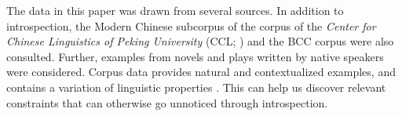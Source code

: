 The data in this paper was drawn from several sources.
In addition to introspection, the Modern Chinese subcorpus of the corpus of the \textit{Center for Chinese Linguistics of Peking University} ({CCL}; \citealt{Zhanetal2003, Zhanetal2019}) and the BCC corpus \citep{BCC} were also consulted. 
Further, examples from novels and plays written by native speakers were considered.
Corpus data provides natural and contextualized examples, and contains a variation of linguistic properties \citep[921]{MM2009a}.
This can help us discover relevant constraints that can otherwise go unnoticed through introspection.